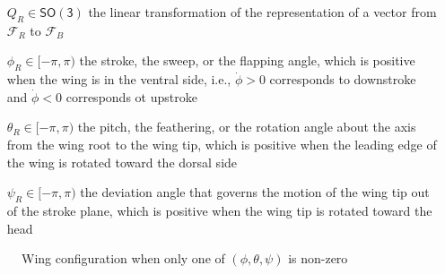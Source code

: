 \documentclass[10pt]{article}
\newcommand{\SO}{\ensuremath{\mathsf{SO(3)}}}
\begin{document}
\begin{itemize}[leftmargin=2.5cm]
    \item[$Q_R\in\SO$] the linear transformation of the representation of a vector from $\mathcal{F}_R$ to $\mathcal{F}_B$
    \item[$\phi_R\in[-\pi,\pi)$] the stroke, the sweep, or the flapping angle, which is positive when the wing is in the ventral side, i.e., $\dot\phi>0$ corresponds to downstroke and $\dot\phi<0$ corresponds ot upstroke
    \item[$\theta_R\in[-\pi,\pi)$] the pitch, the feathering, or the rotation angle about the axis from the wing root to the wing tip, which is positive when the leading edge of the wing is rotated toward the dorsal side
    \item[$\psi_R\in[-\pi,\pi)$] the deviation angle that governs the motion of the wing tip out of the stroke plane, which is positive when the wing tip is rotated toward the head 
\end{itemize}

\begin{figure}
    \centerline{
        \footnotesize
}
\caption{Wing configuration when only one of $(\phi,\theta,\psi)$ is non-zero}
\end{figure}
\end{document}
